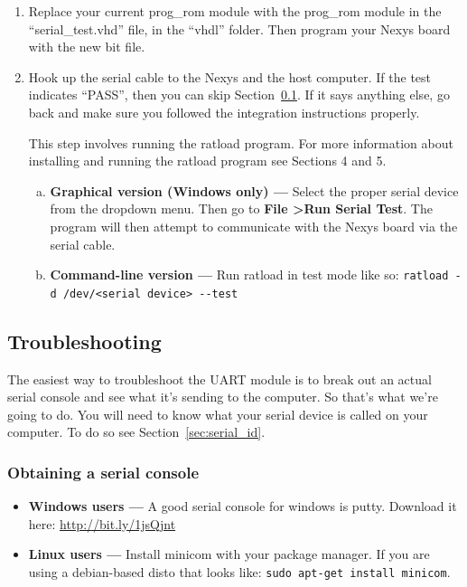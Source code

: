 \documentclass[notitlepage]{article}
\newcommand{\infosign}{\fontencoding{U}\fontfamily{futs}\huge\selectfont\char 116\relax}
\begin{document}
\begin{enumerate}
\item Replace your current prog\_rom module with the prog\_rom module in the ``serial\_test.vhd'' file, in the ``vhdl'' folder. Then program your Nexys board with the new bit file.
\item Hook up the serial cable to the Nexys and the host computer. If the test indicates ``PASS'', then you can skip Section~\ref{sec:troubleshooting}. If it says anything else, go back and make sure you followed the integration instructions properly.

\begin{infobox}
  {\infosign} This step involves running the ratload program. For more information about installing and running the ratload program see Sections 4 and 5. %
\end{infobox}

  \begin{enumerate}[a.]
  \item \textbf{Graphical version (Windows only) ---} Select the proper serial device from the dropdown menu. Then go to \textbf{File \textgreater Run Serial Test}. The program will then attempt to communicate with the Nexys board via the serial cable.

  \item \textbf{Command-line version ---} Run ratload in test mode like so: \texttt{ratload -d /dev/<serial device> -{}-test}
  \end{enumerate}
\end{enumerate}

\subsection{Troubleshooting}
\label{sec:troubleshooting}
The easiest way to troubleshoot the UART module is to break out an actual serial console and see what it's sending to the computer. So that's what we're going to do. You will need to know what your serial device is called on your computer. To do so see Section~\ref{sec:serial_id}.
\subsubsection{Obtaining a serial console}
\begin{itemize}
\item \textbf{Windows users --- } A good serial console for windows is putty. Download it here: \url{http://bit.ly/1jsQjnt}
\item \textbf{Linux users --- } Install minicom with your package manager. If you are using a debian-based disto that looks like: \texttt{sudo apt-get install minicom}.
\end{itemize}
\end{document}

